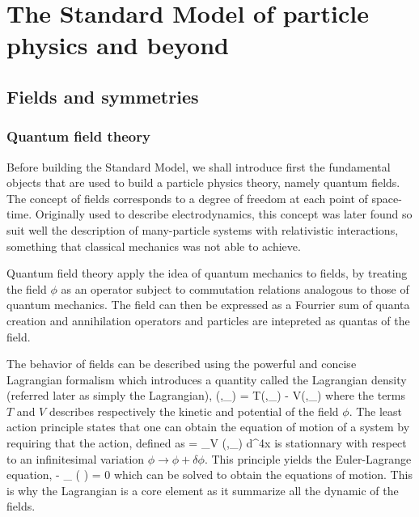 


\tableofcontents

\newpage


\chapter{The Standard Model of particle physics and beyond}

    \section{Fields and symmetries}

        \subsection{Quantum field theory}

    Before building the Standard Model, we shall introduce first the fundamental objects
    that are used to build a particle physics theory, namely quantum fields. The concept
    of fields corresponds to a degree of freedom at each point of space-time. Originally
    used to describe electrodynamics, this concept was later found so suit well the
    description of many-particle systems with relativistic interactions, something that
    classical mechanics was not able to achieve.

    Quantum field theory apply the idea of quantum mechanics to fields, by treating the
    field $\phi$ as an operator subject to commutation relations analogous to those of
    quantum mechanics. The field can then be expressed as a Fourrier sum of quanta
    creation and annihilation operators and particles are intepreted as quantas of
    the field.

    The behavior of fields can be described using the powerful and concise Lagrangian
    formalism which introduces a quantity called the Lagrangian density (referred later
    as simply the Lagrangian),
    {
        (\phi,\partial_\mu \phi)
        =
        T(\phi,\partial_\mu \phi) - V(\phi,\partial_\mu \phi)
    }
    where the terms $T$ and $V$ describes respectively the kinetic and potential of the
    field $\phi$. The least action principle states that one can obtain the equation of
    motion of a system by requiring that the action, defined as
    {
        =
        \int_V (\phi,\partial_\mu \phi) d^4x
    }
    is stationnary with respect to an infinitesimal variation $\phi \rightarrow \phi +
    \delta\phi$. This principle yields the Euler-Lagrange equation,
    {
        -
        \partial_\mu
        \left(
        \right)
        =
        0
        }
    which can be solved to obtain the equations of motion. This is why the Lagrangian is
    a core element as it summarize all the dynamic of the fields.

